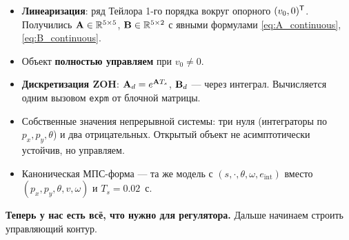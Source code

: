 \begin{itemize}
  \item \textbf{Линеаризация}: ряд Тейлора 1-го порядка вокруг опорного
        $(v_0, 0)^{\mathsf{T}}$. Получились $\mathbf{A} \in \mathbb{R}^{5\times 5}$,
        $\mathbf{B} \in \mathbb{R}^{5\times 2}$ с явными формулами \eqref{eq:A_continuous},
        \eqref{eq:B_continuous}.
  \item Объект \textbf{полностью управляем} при $v_0 \ne 0$.
  \item \textbf{Дискретизация ZOH}: $\mathbf{A}_d = e^{\mathbf{A}T_s}$, $\mathbf{B}_d$
        --- через интеграл. Вычисляется одним вызовом \texttt{expm} от
        блочной матрицы.
  \item Собственные значения непрерывной системы: три нуля (интеграторы
        по $p_x, p_y, \theta$) и два отрицательных. Открытый объект не
        асимптотически устойчив, но управляем.
  \item Каноническая МПС-форма --- та же модель с $(s, \cdot, \theta, \omega,
        e_\text{int})$ вместо $(p_x, p_y, \theta, v, \omega)$ и
        $T_s = 0.02$~с.
\end{itemize}

\medskip
\textbf{Теперь у нас есть всё, что нужно для регулятора.} Дальше начинаем
строить управляющий контур.
